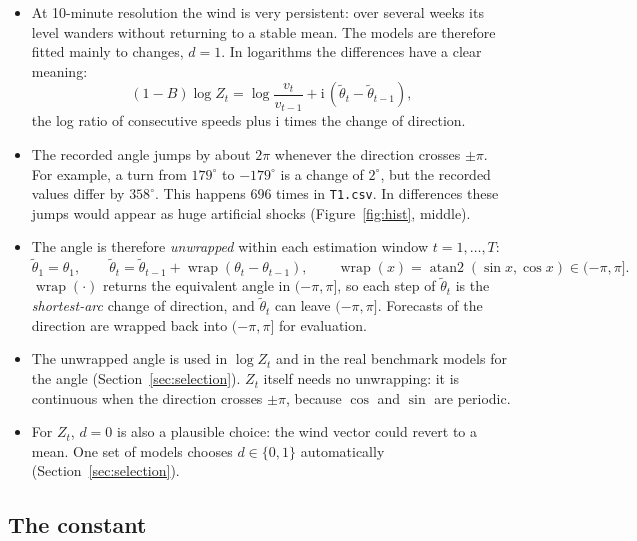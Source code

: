 \documentclass[11pt,a4paper]{article}
\newcommand{\iu}{\mathrm{i}}
\newcommand{\code}[1]{\texttt{#1}}
\DeclareMathOperator{\wrap}{wrap}
\newcommand{\1}{\mathbf{1}}
\begin{document}
\begin{itemize}
  \item At 10-minute resolution the wind is very persistent: over several weeks its level wanders
    without returning to a stable mean. The models are therefore fitted mainly to changes,
    $d = 1$. In logarithms the differences have a clear meaning:
    \begin{equation}
      (1-B)\log Z_t = \log\frac{v_t}{v_{t-1}} + \iu\,(\tilde\theta_t - \tilde\theta_{t-1}),
    \end{equation}
    the log ratio of consecutive speeds plus $\iu$ times the change of direction.
  \item The recorded angle jumps by about $2\pi$ whenever the direction crosses $\pm\pi$. For
    example, a turn from $179^\circ$ to $-179^\circ$ is a change of $2^\circ$, but the recorded
    values differ by $358^\circ$. This happens 696 times in \code{T1.csv}. In differences these
    jumps would appear as huge artificial shocks (Figure~\ref{fig:hist}, middle).
  \item The angle is therefore \emph{unwrapped} within each estimation window $t = 1, \dots, T$:
    \begin{equation}\label{eq:unwrap}
      \tilde\theta_1 = \theta_1, \qquad
      \tilde\theta_t = \tilde\theta_{t-1} + \wrap(\theta_t - \theta_{t-1}), \qquad
      \wrap(x) = \operatorname{atan2}(\sin x, \cos x) \in (-\pi, \pi].
    \end{equation}
    $\wrap(\cdot)$ returns the equivalent angle in $(-\pi, \pi]$, so each step of $\tilde\theta_t$
    is the \emph{shortest-arc} change of direction, and $\tilde\theta_t$ can leave $(-\pi, \pi]$.
    Forecasts of the direction are wrapped back into $(-\pi, \pi]$ for evaluation.
  \item The unwrapped angle is used in $\log Z_t$ and in the real benchmark models for the
    angle (Section~\ref{sec:selection}). $Z_t$ itself needs no unwrapping: it is continuous when
    the direction crosses $\pm\pi$, because $\cos$ and $\sin$ are periodic.
  \item For $Z_t$, $d = 0$ is also a plausible choice: the wind vector could revert to a mean.
    One set of models chooses $d \in \{0, 1\}$ automatically (Section~\ref{sec:selection}).
\end{itemize}


\subsection{The constant}\label{sec:constant}
\end{document}
